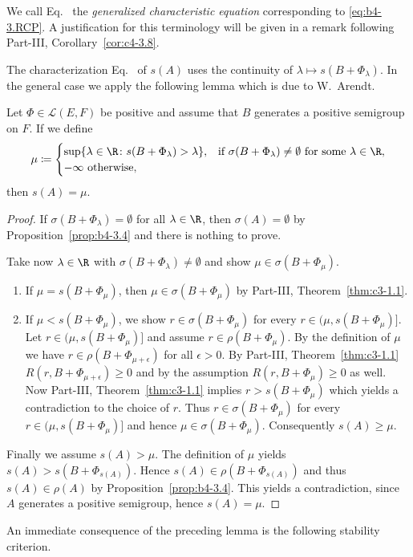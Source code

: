 \begin{remark*}
	We call Eq.~ the \emph{generalized characteristic equation} corresponding to \eqref{eq:b4-3.RCP}. 
	A justification for this terminology will be given in a remark following Part-III, Corollary~\ref{cor:c4-3.8}.
\end{remark*}
The characterization Eq.~ of\/ $s(A)$ uses the continuity of\/ $\lambda \mapsto s(B + \Phi_{\lambda})$. 
In the general case we apply the following lemma which is due to W.~Arendt.

\begin{lemma*} 
	Let  $\Phi \in \mathcal{L}(E,F)$  be positive and assume that  $B$ generates a positive semigroup on  $F$. 
	If we define
	\[
	\mu \coloneq 
	\begin{cases}
		\sup\{\lambda \in \R \colon s(B+\Phi_{\lambda}) > \lambda\},  & \text{if } \sigma(B+\Phi_{\lambda}) \neq \emptyset \text{ for some } \lambda \in \R, \\
		-\infty   \text{ otherwise}, &
	\end{cases}
	\]
	then  $s(A) = \mu$.
\end{lemma*}	
\begin{proof}
If\/ $\sigma(B+\Phi_{\lambda}) = \emptyset$ for all $\lambda \in \R$, then $\sigma(A) = \emptyset$ by Proposition~\ref{prop:b4-3.4} and there is nothing to prove.

Take now $\lambda \in \R$ with $\sigma(B+\Phi_{\lambda}) \neq \emptyset$ and show $\mu \in \sigma(B+\Phi_{\mu})$.
\begin{enumerate}[label={Case~\arabic*: }, wide, labelindent=0em]
\item 
If\/ $\mu = s(B+\Phi_{\mu})$, then $\mu \in \sigma(B+\Phi_{\mu})$ by Part-III, Theorem~\ref{thm:c3-1.1}.

\item 
If\/ $\mu < s(B+\Phi_{\mu})$, we show $r \in \sigma(B+\Phi_{\mu})$ for every $r \in (\mu,s(B+\Phi_{\mu})]$.
Let $r \in (\mu,s(B+\Phi_{\mu})]$ and assume $r \in \rho(B+\Phi_{\mu})$. 
By the definition of\/ $\mu$ we have $r \in \rho(B+\Phi_{\mu+\epsilon})$ for all $\epsilon > 0$. 
By Part-III, Theorem~\ref{thm:c3-1.1} $R(r,B+\Phi_{\mu+\epsilon}) \geq 0$ and by the assumption $R(r,B+\Phi_{\mu}) \geq 0$ as well. 
Now Part-III, Theorem~\ref{thm:c3-1.1} implies $r > s(B+\Phi_{\mu})$ which yields a contradiction to the choice of\/ $r$. 
Thus $r \in \sigma(B+\Phi_{\mu})$ for every $r \in (\mu,s(B+\Phi_{\mu})]$ and hence $\mu \in \sigma(B+\Phi_{\mu})$. 
Consequently $s(A) \geq \mu$.
\end{enumerate}

Finally we assume $s(A) > \mu$. 
The definition of\/ $\mu$ yields $s(A) > s(B+\Phi_{s(A)})$. 
Hence $s(A) \in \rho(B+\Phi_{s(A)})$ and thus $s(A) \in \rho(A)$ by Proposition~\ref{prop:b4-3.4}. 
This yields a contradiction, since $A$ generates a positive semigroup, hence $s(A) = \mu$.
\end{proof}
An immediate consequence of the preceding lemma is the following stability criterion.

